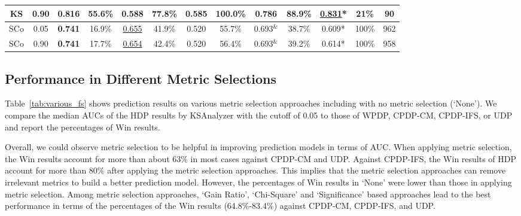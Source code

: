 \begin{table}[ht]
\begin{tabular}{|c|c||c|c||c|c||c|c||c|c||c|c|@{ }c@{ }|}
KS& 0.90
& 0.816 & 55.6\%
&0.588 & 77.8\%
& 0.585	&100.0\%
& 0.786	&88.9\%
&\underline{0.831}* &21\%
& 90
\\ \hline
\hline
\hline

SCo & 0.05
& \bf{0.741} & 16.9\%
&\underline{0.655} &41.9\%
& 0.520	&55.7\%
& 0.693$^{\&}$	&38.7\%
&0.609* & 100\%
& 962
\\
\hline
SCo& 0.90
& {\bf 0.741} & 17.7\%
&\underline{0.654} & 42.4\%
&0.520	&56.4\%
& 0.693$^{\&}$ &39.2\%
&0.614* &100\%
& 958
\\
\hline

\end{tabular}
\end{table}

\subsection{Performance in Different Metric Selections}
\label{subsec04}

Table~\ref{tab:various_fs} shows prediction results on various metric selection approaches
including with no metric selection (`None'). We compare the median AUCs of
the HDP results by KSAnalyzer with the cutoff of 0.05 to those of WPDP, CPDP-CM,
CPDP-IFS, or UDP and report the percentages of Win results.

Overall, we could observe metric selection to be helpful in improving
prediction models in terms of AUC. When applying metric selection, the Win results
account for more than about 63\% in most cases against CPDP-CM and UDP. Against
CPDP-IFS, the Win results of HDP account for more than 80\% after applying the
metric selection approaches. This implies that the metric selection approaches
can remove irrelevant metrics to build a better prediction model.
However, the percentages of Win results in `None' were lower than those in
applying metric selection. Among metric selection approaches, `Gain Ratio', `Chi-Square' and
`Significance' based approaches lead to the best performance in terms of the
percentages of the Win results (64.8\%-83.4\%) against CPDP-CM, CPDP-IFS, and UDP.

